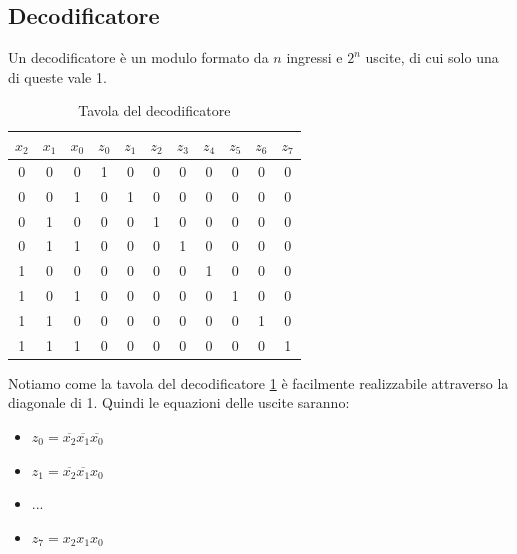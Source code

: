 \subsection{Decodificatore}
Un decodificatore è un modulo formato da $n$ ingressi e $2^n$ uscite, di cui solo una di queste vale 1.

\begin{center}
\end{center}

\begin{table}[ht]
    \centering
    \begin{tabular}{ccc|cccccccc}
        $x_2$&$x_1$&$x_0$ & $z_0$&$z_1$&$z_2$&$z_3$&$z_4$&$z_5$&$z_6$&$z_7$\\\hline
        0&0&0 & 1&0&0&0&0&0&0&0 \\
        0&0&1 & 0&1&0&0&0&0&0&0 \\
        0&1&0 & 0&0&1&0&0&0&0&0 \\
        0&1&1 & 0&0&0&1&0&0&0&0 \\\hline
        1&0&0 & 0&0&0&0&1&0&0&0 \\
        1&0&1 & 0&0&0&0&0&1&0&0 \\
        1&1&0 & 0&0&0&0&0&0&1&0 \\
        1&1&1 & 0&0&0&0&0&0&0&1 \\
    \end{tabular}
    \caption{Tavola del decodificatore}
    \label{tab:decodific}
\end{table}
Notiamo come la tavola del decodificatore \ref{tab:decodific} è facilmente realizzabile attraverso la diagonale di 1.
Quindi le equazioni delle uscite saranno:
\begin{itemize}
    \item[] $z_0=\overline{x_2}\overline{x_1}\overline{x_0}$
    \item[] $z_1=\overline{x_2}\overline{x_1}x_0$
    \item[] ...
    \item[] $z_7=x_2x_1x_0$
\end{itemize}

